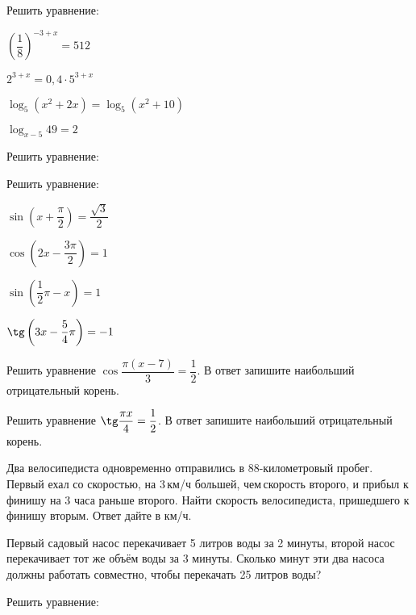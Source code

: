 \begin{listofex}
	\item Решить уравнение:
	\begin{enumcols}[itemcolumns=2]
		\item \( \left( \dfrac{1}{8} \right)^{-3+x}=512 \) 
		\item {}
		\item {}
		\item {}
		\item \( 2^{3+x}=0,4\cdot5^{3+x} \)
		\item \(\log_5(x^2+2x)=\log_5(x^2+10) \)
		\item \( \log_{x-5}49=2 \) 
	\end{enumcols}
	\item Решить уравнение:
	\begin{enumcols}[itemcolumns=1]
		\item {}
		\item {}
	\end{enumcols}
	\item Решить уравнение:
	\begin{enumcols}[itemcolumns=2]
		\item \( \sin \left( x+\dfrac{\pi}{2} \right) = \dfrac{\sqrt{3}}{2} \) 
		\item \( \cos \left( 2x-\dfrac{3\pi}{2} \right) = 1 \) 
		\item \( \sin \left( \dfrac{1}{2}\pi-x \right)=1 \)
		\item \( \tg\left( 3x-\dfrac{5}{4}\pi \right)=-1 \)
	\end{enumcols}
	\item Решить уравнение \( \cos\dfrac{\pi(x-7)}{3}=\dfrac{1}{2} \). В ответ запишите наибольший отрицательный корень.
	\item Решить уравнение \( \tg\dfrac{\pi x}{4}=\dfrac{1}{2} \). В ответ запишите наибольший отрицательный корень.
	\item {}
	\item Два велосипедиста одновременно отправились в 88-километровый пробег. Первый ехал со скоростью, на 3 км/ч большей, чем скорость второго, и прибыл к финишу на 3 часа раньше второго. Найти скорость велосипедиста, пришедшего к финишу вторым. Ответ дайте в км/ч.
	\item Первый садовый насос перекачивает 5 литров воды за 2 минуты, второй насос перекачивает тот же объём воды за 3 минуты. Сколько минут эти два насоса должны работать совместно, чтобы перекачать 25 литров воды?
	\item Решить уравнение:
	\begin{enumcols}[itemcolumns=2]
		\item {}
		\item {}
	\end{enumcols}
\end{listofex}
